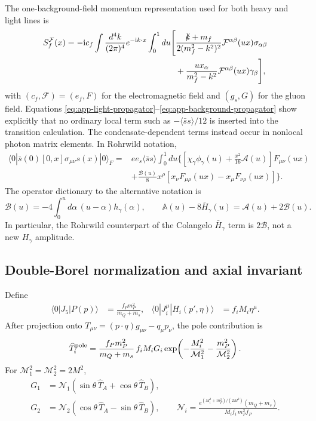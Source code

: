 \documentclass[11pt]{article}
\newcommand{\ii}{\mathrm{i}}
\newcommand{\ssbar}{\langle\bar s s\rangle}
\begin{document}
The one-background-field momentum representation used for both heavy and
light lines is
\begin{align}
 S_f^{\mathcal F}(x)=-\ii c_f\int\frac{d^4k}{(2\pi)^4}e^{-\ii k\cdot x}
 \int_0^1du\Bigg[
 &\frac{\slashed{k}+m_f}{2(m_f^2-k^2)^2}
 \mathcal F^{\alpha\beta}(ux)\sigma_{\alpha\beta}\nonumber\\
 &+\frac{ux_\alpha}{m_f^2-k^2}
 \mathcal F^{\alpha\beta}(ux)\gamma_\beta\Bigg],
 \label{eq:app-background-propagator}
\end{align}
with $(c_f,\mathcal F)=(e_f,F)$ for the electromagnetic field and
$(g_s,G)$ for the gluon field.  Equations
\eqref{eq:app-light-propagator}--\eqref{eq:app-background-propagator} show
explicitly that no ordinary local term such as
$-\langle\bar ss\rangle/12$ is inserted into the transition calculation.
The condensate-dependent terms instead occur in nonlocal photon matrix
elements.  In Rohrwild notation,
\begin{align}
 \langle0|\bar s(0)[0,x]\sigma_{\mu\nu}s(x)|0\rangle_F
 ={}&e e_s\ssbar\int_0^1du\Bigg\{
 \left[\chi_\gamma\phi_\gamma(u)+\frac{x^2}{16}\mathcal A(u)\right]
 F_{\mu\nu}(ux)\nonumber\\
 &+\frac{\mathcal B(u)}8x^\rho
 [x_\nu F_{\mu\rho}(ux)-x_\mu F_{\nu\rho}(ux)]
 \Bigg\}.
 \label{eq:app-photon-matrix-element}
\end{align}
The operator dictionary to the alternative notation is
\begin{equation}
 \mathcal B(u)=-4\int_0^u d\alpha\,(u-\alpha)h_\gamma(\alpha),
 \qquad
 \mathbb A(u)-8\bar H_\gamma(u)=\mathcal A(u)+2\mathcal B(u).
 \label{eq:app-Rohrwild-B-dictionary}
\end{equation}
In particular, the Rohrwild counterpart of the Colangelo
$\bar H_\gamma$ term is $2\mathcal B$, not a new $H_\gamma$ amplitude.

\subsection{Double-Borel normalization and axial invariant}

Define
\begin{align}
 \langle0|J_5|P(p)\rangle&=\frac{f_Pm_P^2}{m_Q+m_s},&
 \langle0|J_i^\mu|H_i(p',\eta)\rangle&=f_iM_i\eta^\mu .
\end{align}
After projection onto
$T_{\mu\nu}=(p\!\cdot q)g_{\mu\nu}-q_\mu p_\nu$, the pole contribution is
\begin{equation}
 \widehat T_i^{\rm pole}
 =\frac{f_Pm_P^2}{m_Q+m_s}\,f_iM_iG_i
 \exp\!\left(-\frac{M_i^2}{\mathcal M_1^2}
             -\frac{m_P^2}{\mathcal M_2^2}\right).
 \label{eq:app-pole}
\end{equation}
For $\mathcal M_1^2=\mathcal M_2^2=2M^2$,
\begin{align}
 G_1&=\mathcal N_1(\sin\theta\,\widehat T_A
                   +\cos\theta\,\widehat T_B),\nonumber\\
 G_2&=\mathcal N_2(\cos\theta\,\widehat T_A
                   -\sin\theta\,\widehat T_B),\qquad
 \mathcal N_i=
 \frac{e^{(M_i^2+m_P^2)/(2M^2)}(m_Q+m_s)}
 {M_if_i\,m_P^2f_P}.
 \label{eq:app-physical-lcsr}
\end{align}
\end{document}
